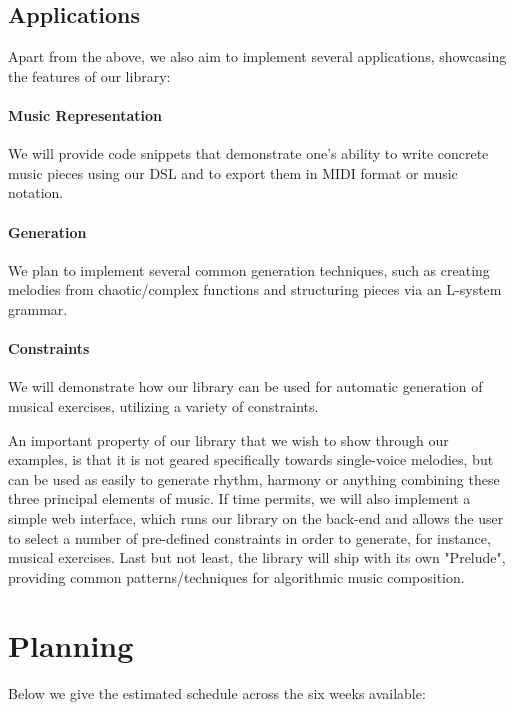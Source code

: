 \documentclass[10pt,a4paper]{article}
\begin{document}
\subsection{Applications}
Apart from the above, we also aim to implement several applications, showcasing the features of our library:
\vspace{-10pt}
\paragraph{Music Representation} We will provide code snippets that demonstrate one's ability to write concrete music pieces using our DSL and to export them in MIDI format or music notation.
\vspace{-10pt}
\paragraph{Generation} We plan to implement several common generation techniques, such as creating melodies from 
chaotic/complex functions\cite{chaos} and structuring pieces via an L-system grammar\cite{lsystem}.
\vspace{-10pt}
\paragraph{Constraints} We will demonstrate how our library can be used for automatic generation of musical exercises, utilizing a variety of constraints.
\vspace{5pt}

An important property of our library that we wish to show through our examples, is that it is not geared specifically towards single-voice melodies, but can be used as easily to generate rhythm, harmony or anything combining these three principal elements of music.
If time permits, we will also implement a simple web interface, which runs our library on the back-end and allows the user to select a number of pre-defined constraints in order to generate, for instance, musical exercises.
Last but not least, the library will ship with its own "Prelude", providing common patterns/techniques for algorithmic music composition.

\section{Planning}
Below we give the estimated schedule across the six weeks available:
\vspace{.5cm}

\startchronology
{}
\stopchronology
\vspace{.5cm}



\end{document}
